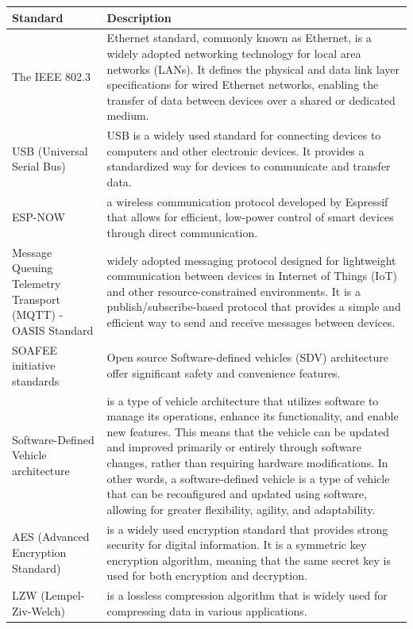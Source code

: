 \documentclass[
12pt,
oneside, 
onehalfspacing, 
nolistspacing, 
parskip, 
chapterinoneline, 
]{AASTCOMPUTER}
\begin{document}
\begin{tabular}{|p{5cm}|p{10cm}|}
  \hline
  \textbf{Standard} & \textbf{Description} \\
  \hline
      The IEEE 802.3 & Ethernet standard, commonly known as Ethernet, is a widely adopted networking technology for local area networks (LANs). It defines the physical and data link layer specifications for wired Ethernet networks, enabling the transfer of data between devices over a shared or dedicated medium. \\
    \hline
    USB (Universal Serial Bus)&  USB is a widely used standard for connecting devices to computers and other electronic devices. It provides a standardized way for devices to communicate and transfer data. \\

  \hline
    ESP-NOW & a wireless communication protocol developed by Espressif that allows for efficient, low-power control of smart devices through direct communication. \\     
      \hline
        Message Queuing Telemetry Transport (MQTT) - OASIS Standard & widely adopted messaging protocol designed for lightweight communication between devices in Internet of Things (IoT) and other resource-constrained environments. It is a publish/subscribe-based protocol that provides a simple and efficient way to send and receive messages between devices. \\
  \hline
      SOAFEE initiative standards & Open source Software-defined vehicles (SDV) architecture offer significant safety and convenience features. \\
 \hline
       Software-Defined Vehicle architecture & is a type of vehicle architecture that utilizes software to manage its operations, enhance its functionality, and enable new features. This means that the vehicle can be updated and improved primarily or entirely through software changes, rather than requiring hardware modifications. In other words, a software-defined vehicle is a type of vehicle that can be reconfigured and updated using software, allowing for greater flexibility, agility, and adaptability. \\
 \hline
 
       AES (Advanced Encryption Standard) & is a widely used encryption standard that provides strong security for digital information. It is a symmetric key encryption algorithm, meaning that the same secret key is used for both encryption and decryption. \\
 \hline
 
        LZW (Lempel-Ziv-Welch) & is a lossless compression algorithm that is widely used for compressing data in various applications. \\
 \hline
\end{tabular}
\newpage
\end{document}
